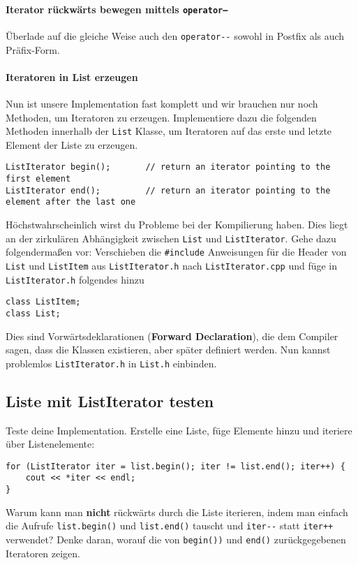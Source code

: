 \paragraph{Iterator rückwärts bewegen mittels \texttt{operator--}}
Überlade auf die gleiche Weise auch den \texttt{operator-{}-} sowohl in Postfix als auch Präfix-Form.

\paragraph{Iteratoren in List erzeugen} 
Nun ist unsere Implementation fast komplett und wir brauchen nur noch Methoden, um Iteratoren zu erzeugen.
Implementiere dazu die folgenden Methoden innerhalb der \texttt{List} Klasse, um Iteratoren auf das erste und letzte Element der Liste zu erzeugen.
\begin{lstlisting}
ListIterator begin();		// return an iterator pointing to the first element
ListIterator end();			// return an iterator pointing to the element after the last one
\end{lstlisting}

Höchstwahrscheinlich wirst du Probleme bei der Kompilierung haben.
Dies liegt an der zirkulären Abhängigkeit zwischen \texttt{List} und \texttt{ListIterator}.
Gehe dazu folgendermaßen vor:
Verschieben die \texttt{\#include} Anweisungen für die Header von \texttt{List} und \texttt{ListItem} aus \texttt{ListIterator.h} nach \texttt{ListIterator.cpp} und füge in \texttt{ListIterator.h} folgendes hinzu

\begin{lstlisting}
class ListItem;
class List;
\end{lstlisting}

Dies sind Vorwärtsdeklarationen (\textbf{Forward Declaration}), die dem Compiler sagen, dass die Klassen existieren, aber später definiert werden. Nun kannst problemlos \texttt{ListIterator.h} in \texttt{List.h} einbinden.

\subsection{Liste mit ListIterator testen}
Teste deine Implementation.
Erstelle eine Liste, füge Elemente hinzu und iteriere über Listenelemente:

\begin{lstlisting}
for (ListIterator iter = list.begin(); iter != list.end(); iter++) {
	cout << *iter << endl;
}
\end{lstlisting}

Warum kann man \textbf{nicht} rückwärts durch die Liste iterieren, indem man einfach die Aufrufe \texttt{list.begin()} und \texttt{list.end()} tauscht und \texttt{iter-{}-} statt \texttt{iter++} verwendet?
Denke daran, worauf die von \texttt{begin())} und \texttt{end()} zurückgegebenen Iteratoren zeigen.

